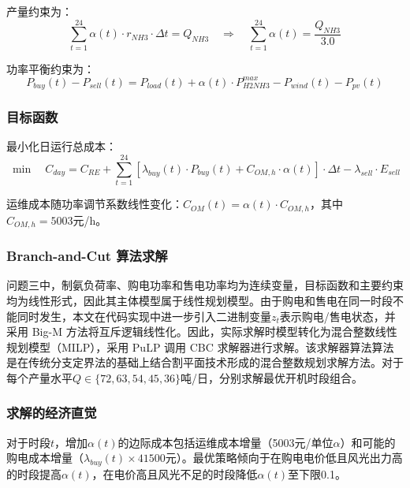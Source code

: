 产量约束为：
\begin{equation}\label{eq:q3_production}
\sum_{t=1}^{24} \alpha(t) \cdot r_{NH3} \cdot \Delta t = Q_{NH3} \quad \Rightarrow \quad \sum_{t=1}^{24} \alpha(t) = \frac{Q_{NH3}}{3.0}
\end{equation}

功率平衡约束为：
\begin{equation}
P_{buy}(t) - P_{sell}(t) = P_{load}(t) + \alpha(t) \cdot P_{H2NH3}^{max} - P_{wind}(t) - P_{pv}(t)
\end{equation}

\subsubsection{目标函数}

最小化日运行总成本：
\begin{equation}\label{eq:q3_obj}
\min \quad C_{day} = C_{RE} + \sum_{t=1}^{24} [\lambda_{buy}(t) \cdot P_{buy}(t) + C_{OM,h} \cdot \alpha(t)] \cdot \Delta t - \lambda_{sell} \cdot E_{sell}
\end{equation}

运维成本随功率调节系数线性变化：$C_{OM}(t) = \alpha(t) \cdot C_{OM,h}$，其中$C_{OM,h} = 5003$元/h。

\subsubsection{Branch-and-Cut 算法求解}

问题三中，制氨负荷率、购电功率和售电功率均为连续变量，目标函数和主要约束均为线性形式，因此其主体模型属于线性规划模型。由于购电和售电在同一时段不能同时发生，本文在代码实现中进一步引入二进制变量$z_t$表示购电/售电状态，并采用 Big-M 方法将互斥逻辑线性化。因此，实际求解时模型转化为混合整数线性规划模型（MILP），采用 PuLP 调用 CBC 求解器进行求解。该求解器算法算法是在传统分支定界法的基础上结合割平面技术形成的混合整数规划求解方法。对于每个产量水平$Q \in \{72, 63, 54, 45, 36\}$吨/日，分别求解最优开机时段组合。

\subsubsection{求解的经济直觉}

对于时段$t$，增加$\alpha(t)$的边际成本包括运维成本增量（5003元/单位$\alpha$）和可能的购电成本增量（$\lambda_{buy}(t) \times 41500$元）。最优策略倾向于在购电电价低且风光出力高的时段提高$\alpha(t)$，在电价高且风光不足的时段降低$\alpha(t)$至下限0.1。

